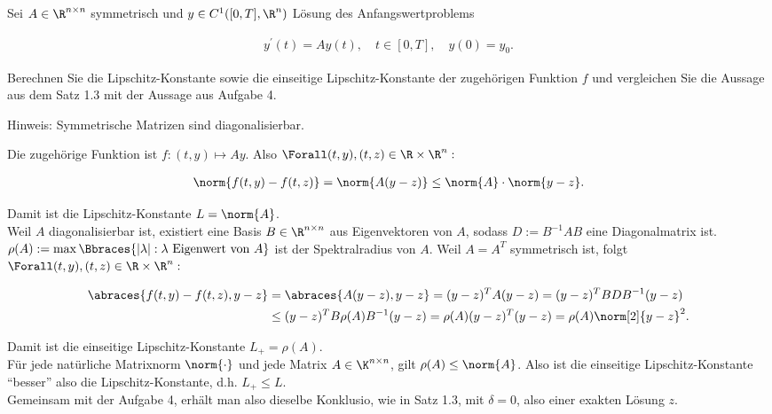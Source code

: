 \begin{exercise}

Sei $A \in \R^{n \times n}$ symmetrisch und $y \in C^1([0, T], \R^n)$ Lösung des Anfangswertproblems

\begin{align*}
  y^\prime(t) = A y(t),
  \quad
  t \in [0, T],
  \quad
  y(0) = y_0.
\end{align*}

Berechnen Sie die Lipschitz-Konstante sowie die einseitige Lipschitz-Konstante der zugehörigen Funktion $f$ und vergleichen Sie die Aussage aus dem Satz 1.3 mit der Aussage aus Aufgabe 4.

Hinweis: Symmetrische Matrizen sind diagonalisierbar.

\end{exercise}

\begin{solution}

Die zugehörige Funktion ist $f: (t, y) \mapsto Ay$.
Also $\Forall (t, y), (t, z) \in \R \times \R^n:$

\begin{align*}
  \norm{f(t, y) - f(t, z)}
  =
  \norm{A (y - z)}
  \leq
  \norm{A} \cdot \norm{y - z}.
\end{align*}

Damit ist die Lipschitz-Konstante $L = \norm{A}$. \\

Weil $A$ diagonalisierbar ist, existiert eine Basis $B \in \R^{n \times n}$ aus Eigenvektoren von $A$, sodass $D := B^{-1} A B$ eine Diagonalmatrix ist.
$\rho(A) := \max \Bbraces{|\lambda|: \lambda \text{ Eigenwert von } A}$ ist der Spektralradius von $A$.
Weil $A = A^T$ symmetrisch ist, folgt $\Forall (t, y), (t, z) \in \R \times \R^n:$

\begin{align*}
  \abraces{f(t, y) - f(t, z), y - z}
  & =
  \abraces{A (y - z), y - z}
  =
  (y - z)^T A (y - z)
  =
  (y - z)^T B D B^{-1} (y - z) \\
  & \leq
  (y - z)^T B \rho(A) B^{-1} (y - z)
  =
  \rho(A) (y - z)^T (y - z)
  =
  \rho(A) \norm[2]{y - z}^2.
\end{align*}

Damit ist die einseitige Lipschitz-Konstante $L_+ = \rho(A)$. \\

Für jede natürliche Matrixnorm $\norm{\cdot}$ und jede Matrix $A \in \K^{n \times n}$, gilt $\rho(A) \leq \norm{A}$. Also ist die einseitige Lipschitz-Konstante \enquote{besser} also die Lipschitz-Konstante, d.h. $L_+ \leq L$. \\

Gemeinsam mit der Aufgabe 4, erhält man also dieselbe Konklusio, wie in Satz 1.3, mit $\delta = 0$, also einer exakten Lösung $z$.

\end{solution}
